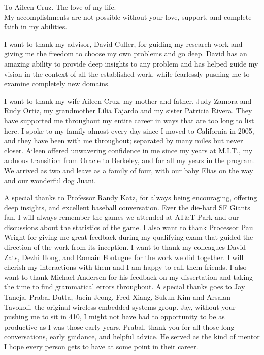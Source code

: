 \documentclass{ucbthesis}
\begin{document}
\begin{frontmatter}

\begin{dedication}
\null\vfil
\begin{center}
To Aileen Cruz.  The love of my life.\\\vspace{12pt}
My accomplishments are not possible without your love, support, and complete faith in my abilities.
\end{center}
\vfil\null
\end{dedication}

\tableofcontents
\clearpage
\listoffigures
\clearpage
\listoftables

\begin{acknowledgements}
I want to thank my advisor, David Culler, for guiding my research work and giving me the
freedom to choose my own problems and go deep.  David has an amazing ability to provide  
deep insights to any problem and has helped guide my vision in 
the context of all the established work, while fearlessly pushing me to examine completely new domains.

I want to thank my wife Aileen Cruz, my mother and father, Judy Zamora and Rudy Ortiz, my 
grandmother Lilia Fajardo and my sister Patricia Rivera.  They have supported me throughout my entire career in ways
that are too long to list here. I spoke to my family almost every day since I moved to California in 2005, and they
have been with me throughout; separated by many miles but never closer.  Aileen offered unwavering confidence in me since 
my years at M.I.T., my arduous transition from Oracle to Berkeley, 
and for all my years in the program.  We arrived as two and leave as a family of four, with our baby Elias on the way and 
our wonderful dog Juani.  

A special thanks to Professor Randy Katz, for always being encouraging, offering deep insights, and 
excellent baseball conversation.  Ever the die-hard SF Giants fan, I will always remember the games we attended
at AT\&T Park and our discussions about the statistics of the game.
I also want to thank Processor Paul Wright for giving me great feedback during my qualifying exam that guided the direction
of the work from its inception.
I want to thank my colleagues David Zats, Dezhi Hong, and Romain Fontugne for the work we did together.  I will cherish my 
interactions with them and I am
happy to call them friends.  I also want to thank Michael Andersen for his feedback on my dissertation and taking the time to
find grammatical errors throughout.  
A special thanks goes to Jay Taneja, Prabal Dutta, Jaein Jeong, Fred Xiang, Sukun Kim and Arsalan 
Tavokoli, the original wireless
embedded systems group.  Jay, without your pushing me to sit in 410, I might not have had to opportunity to be 
as productive as I was those early years.  Prabal, thank you for all those long conversations, early guidance, and helpful advice.  
He served as the kind of
mentor I hope every person gets to have at some point in their career.


\end{acknowledgements}
\end{frontmatter}
\end{document}
